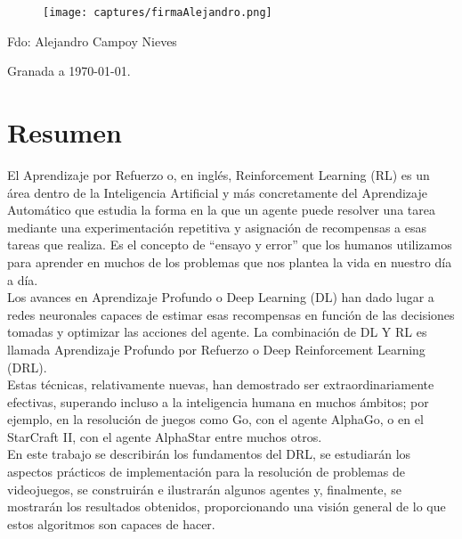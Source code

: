 \documentclass[11pt,fleqn]{book} %
\begin{document}
\vspace{3cm}

\begin{figure}[H]
	\texttt{[image: captures/firmaAlejandro.png]}
\end{figure}

\noindent Fdo: Alejandro Campoy Nieves

\vspace{2cm}

\begin{flushright}
	Granada a \today .
\end{flushright}

\newpage

\section*{Resumen}\label{sec:resumen}

El Aprendizaje por Refuerzo o, en inglés, Reinforcement Learning (RL) es un área dentro de la Inteligencia Artificial y más concretamente del Aprendizaje Automático que estudia la forma en la que un agente puede resolver una tarea mediante una experimentación repetitiva y asignación de recompensas a esas tareas que realiza. Es el concepto de ``ensayo y error'' que los humanos utilizamos para aprender en muchos de los problemas que nos plantea la vida en nuestro día a día. \\

Los avances en Aprendizaje Profundo o Deep Learning (DL) han dado lugar a redes neuronales capaces de estimar esas recompensas en función de las decisiones tomadas y optimizar las acciones del agente. La combinación de DL Y RL es llamada Aprendizaje Profundo por Refuerzo o Deep Reinforcement Learning (DRL). \\

Estas técnicas, relativamente nuevas, han demostrado ser extraordinariamente efectivas, superando incluso a la inteligencia humana en muchos ámbitos; por ejemplo, en la resolución de juegos como Go, con el agente AlphaGo, o en el StarCraft II, con el agente AlphaStar entre muchos otros. \\

En este trabajo se describirán los fundamentos del DRL, se estudiarán los aspectos prácticos de implementación para la resolución de problemas de videojuegos, se construirán e ilustrarán algunos agentes y, finalmente, se mostrarán los resultados obtenidos, proporcionando una visión general de lo que estos algoritmos son capaces de hacer.\\
\end{document}
